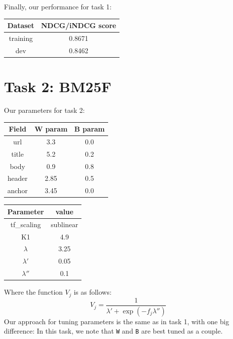 \documentclass[10pt,twocolumn]{article}
\begin{document}
Finally, our performance for task 1:
\begin{table}[H]
\centering
\begin{tabular}{|c|c|}
\hline
Dataset & NDCG/iNDCG score \\\hline
training & 0.8671\\\hline
dev & 0.8462\\\hline
\end{tabular}
\end{table}

\section*{Task 2: BM25F}
Our parameters for task 2:
\begin{table}[H]
\centering
\begin{tabular}{|c|c|c|}
\hline
Field & W param & B param\\\hline
url & 3.3 & 0.0\\\hline
title & 5.2 & 0.2\\\hline
body & 0.9 & 0.8\\\hline
header & 2.85 & 0.5 \\\hline
anchor & 3.45 & 0.0\\\hline
\end{tabular}
\end{table}
\begin{table}[H]
\centering
\begin{tabular}{|c|c|}
\hline
Parameter & value\\\hline
tf\_scaling & sublinear\\\hline
K1 & 4.9\\\hline
$\lambda$ & 3.25\\\hline
$\lambda'$ & 0.05\\\hline
$\lambda''$ & 0.1\\\hline
\end{tabular}
\end{table}
Where the function $V_j$ is as follows:
\begin{equation*}
V_j = \frac{1}{\lambda'+\exp({-f_j\lambda''})}
\end{equation*}
Our approach for tuning parameters is the same as in task 1, with one big difference: In this task, we note that \texttt{W} and \texttt{B} are best tuned as a couple. 
\end{document}
